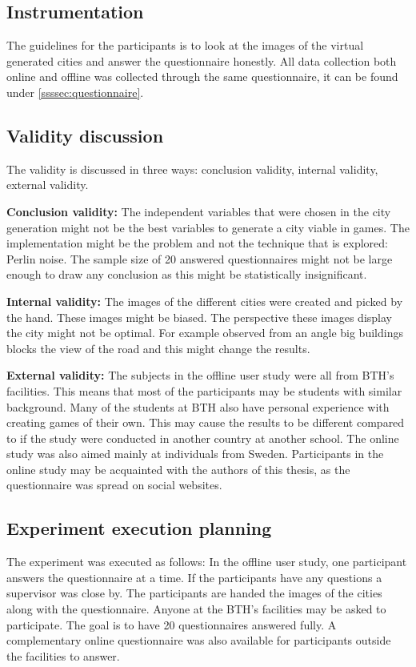 	\subsection{Instrumentation}
	The guidelines for the participants is to look at the images of the virtual generated cities and answer the questionnaire honestly. All data collection both online and offline was collected through the same questionnaire, it can be found under \ref{ssssec:questionnaire}.
			
	\subsection{Validity discussion} 
	The validity is discussed in three ways: conclusion validity, internal validity, external validity\cite{ExperimentationInSoftware}.
	
	\par
	\textbf{Conclusion validity:} The independent variables that were chosen in the city generation might not be the best variables to generate a city viable in games. The implementation might be the problem and not the technique that is explored: Perlin noise. The sample size of 20 answered questionnaires might not be large enough to draw any conclusion as this might be statistically insignificant.
	
	\par
	\textbf{Internal validity:} The images of the different cities were created and picked by the hand. These images might be biased. The perspective these images display the city might not be optimal. For example observed from an angle big buildings blocks the view of the road and this might change the results.
	
	\par
	\textbf{External validity:} The subjects in the offline user study were all from BTH's facilities. This means that most of the participants may be students with similar background. Many of the students at BTH also have personal experience with creating games of their own. This may cause the results to be different compared to if the study were conducted in another country at another school. The online study was also aimed mainly at individuals from Sweden. Participants in the online study may be acquainted with the authors of this thesis, as the questionnaire was spread on social websites.
	
	\subsection{Experiment execution planning}
	The experiment was executed as follows: In the offline user study, one participant answers the questionnaire at a time. If the participants have any questions a supervisor was close by. The participants are handed the images of the cities along with the questionnaire. Anyone at the BTH's facilities may be asked to participate. The goal is to have 20 questionnaires answered fully. A complementary online questionnaire was also available for participants outside the facilities to answer.
		
